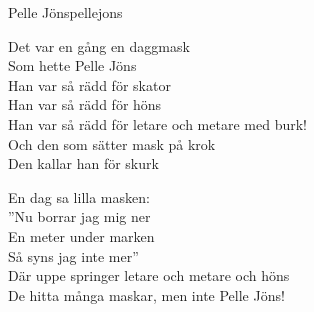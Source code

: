 \begin{song}{Pelle Jöns}{pellejons}
\begin{vers}
Det var en gång en daggmask\\
Som hette Pelle Jöns\\
Han var så rädd för skator\\
Han var så rädd för höns\\
Han var så rädd för letare och metare med burk!\\
Och den som sätter mask på krok\\
Den kallar han för skurk\\
\end{vers}
\begin{vers}
En dag sa lilla masken:\\
''Nu borrar jag mig ner\\
En meter under marken\\
Så syns jag inte mer''\\
Där uppe springer letare och metare och höns\\
De hitta många maskar, men inte Pelle Jöns!\\
\end{vers}
\end{song}
